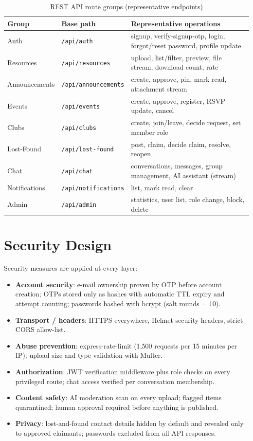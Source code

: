 \documentclass[12pt,a4paper]{report}
\begin{document}
\begin{table}[htbp]
\centering
\caption{REST API route groups (representative endpoints)}
\label{tab:api}
\begin{tabular}{@{}llp{6.6cm}@{}}
\toprule
\textbf{Group} & \textbf{Base path} & \textbf{Representative operations} \\
\midrule
Auth & \texttt{/api/auth} & signup, verify-signup-otp, login,
  forgot/reset password, profile update \\
Resources & \texttt{/api/resources} & upload, list/filter, preview,
  file stream, download count, rate \\
Announcements & \texttt{/api/announcements} & create, approve, pin,
  mark read, attachment stream \\
Events & \texttt{/api/events} & create, approve, register, RSVP
  update, cancel \\
Clubs & \texttt{/api/clubs} & create, join/leave, decide request,
  set member role \\
Lost-Found & \texttt{/api/lost-found} & post, claim, decide claim,
  resolve, reopen \\
Chat & \texttt{/api/chat} & conversations, messages, group
  management, AI assistant (stream) \\
Notifications & \texttt{/api/notifications} & list, mark read,
  clear \\
Admin & \texttt{/api/admin} & statistics, user list, role change,
  block, delete \\
\bottomrule
\end{tabular}
\end{table}

\section{Security Design}
Security measures are applied at every layer:
\begin{itemize}[itemsep=2pt]
  \item \textbf{Account security}: e-mail ownership proven by OTP
        before account creation; OTPs stored only as hashes with
        automatic TTL expiry and attempt counting; passwords hashed
        with bcrypt (salt rounds = 10).
  \item \textbf{Transport / headers}: HTTPS everywhere, Helmet
        security headers, strict CORS allow-list.
  \item \textbf{Abuse prevention}: express-rate-limit (1{,}500
        requests per 15 minutes per IP); upload size and type
        validation with Multer.
  \item \textbf{Authorization}: JWT verification middleware plus
        role checks on every privileged route; chat access verified
        per conversation membership.
  \item \textbf{Content safety}: AI moderation scan on every upload;
        flagged items quarantined; human approval required before
        anything is published.
  \item \textbf{Privacy}: lost-and-found contact details hidden by
        default and revealed only to approved claimants; passwords
        excluded from all API responses.
\end{itemize}
\end{document}
